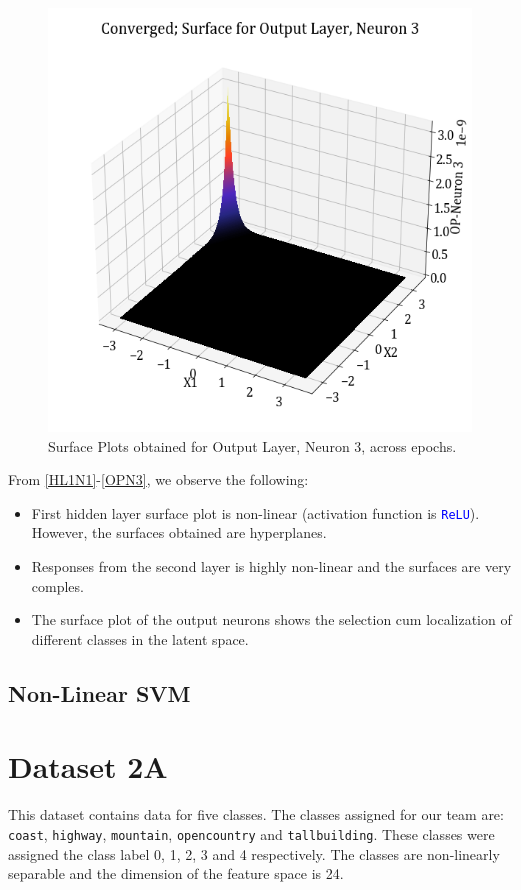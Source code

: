 \documentclass[11pt,a4paper]{article}
\newcommand{\noi}{\noindent}
\def\tt#1{\texttt{#1}}
\def\colortt#1{\textcolor{blue}{\texttt{#1}}}
\begin{document}
\begin{figure}[H]
    \includegraphics[scale=0.4]{images/1B_MLFFNN_conv_OP_N3.png}
    \caption{Surface Plots obtained for Output Layer, Neuron 3, across epochs.}
    \label{OPN3}
\end{figure}

\noi
From \autoref{HL1N1}-\autoref{OPN3}, we observe the following:
\begin{itemize}
    \itemsep0em 
    \item First hidden layer surface plot is non-linear (activation function is \colortt{ReLU}). However, the surfaces obtained are hyperplanes.
    \item Responses from the second layer is highly non-linear and the surfaces are very comples.
    \item The surface plot of the output neurons shows the selection cum localization of different classes in the latent space.
\end{itemize}

\subsection{Non-Linear SVM}

\break
\section{Dataset 2A}
This dataset contains data for five classes. The classes assigned for our team are: \tt{coast}, \tt{highway}, \tt{mountain}, \tt{opencountry} and \tt{tallbuilding}. These classes were assigned the class label 0, 1, 2, 3 and 4 respectively. The classes are non-linearly separable and the dimension of the feature space is 24.
\end{document}
